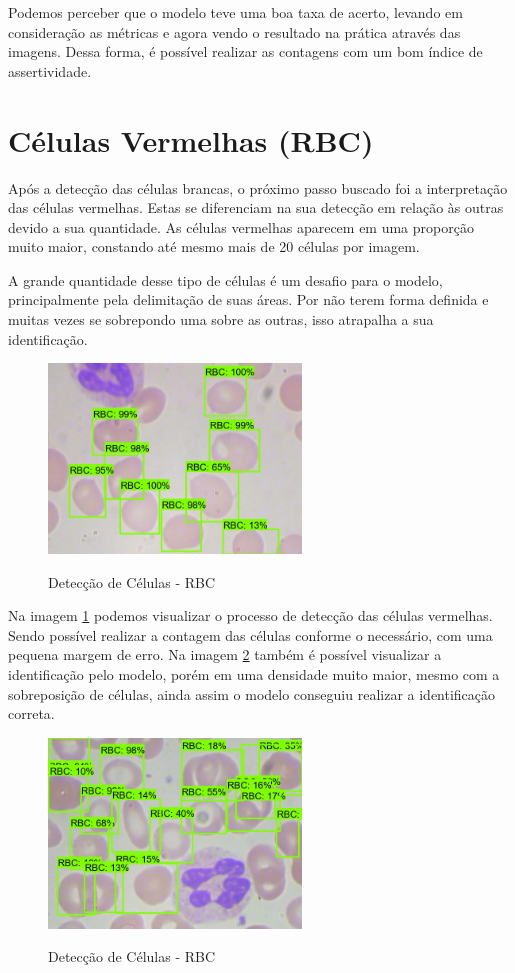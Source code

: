 Podemos perceber que o modelo teve uma boa taxa de acerto, levando em consideração as métricas e agora vendo o resultado na prática através das imagens. Dessa forma, é possível realizar as contagens com um bom índice de assertividade.

\section{Células Vermelhas (RBC)}
Após a detecção das células brancas, o próximo passo buscado foi a interpretação das células vermelhas. Estas se diferenciam na sua detecção em relação às outras devido a sua quantidade. As células vermelhas aparecem em uma proporção muito maior, constando até mesmo mais de 20 células por imagem.

A grande quantidade desse tipo de células é um desafio para o modelo, principalmente pela delimitação de suas áreas. Por não terem forma definida e muitas vezes se sobrepondo uma sobre as outras, isso atrapalha a sua identificação.

\begin{figure}[!htb]
	\centering
	\caption{Detecção de Células - RBC}
	\includegraphics[width=0.60\textwidth]{img/predict_rbc.jpeg}
	\label{fig:predict_rbc}
\end{figure}

Na imagem \ref{fig:predict_rbc} podemos visualizar o processo de detecção das células vermelhas. Sendo possível realizar a contagem das células conforme o necessário, com uma pequena margem de erro. Na imagem \ref{fig:predict_rbc_2} também é possível visualizar a identificação pelo modelo, porém em uma densidade muito maior, mesmo com a sobreposição de células, ainda assim o modelo conseguiu realizar a identificação correta.

\begin{figure}[!htb]
	\centering
	\caption{Detecção de Células - RBC}
	\includegraphics[width=0.60\textwidth]{img/predict_rbc_2.jpeg}
	\label{fig:predict_rbc_2}
\end{figure}

